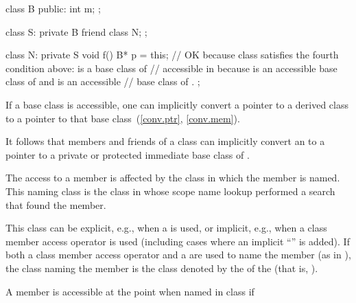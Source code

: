 \begin{example}
\begin{codeblock}
class B {
public:
  int m;
};

class S: private B {
  friend class N;
};

class N: private S {
  void f() {
    B* p = this;    // OK because class  satisfies the fourth condition above:  is a base class of 
                    // accessible in  because  is an accessible base class of  and  is an accessible
                    // base class of .
  }
};
\end{codeblock}
\end{example}

\pnum
If a base class is accessible, one can implicitly convert a pointer to
a derived class to a pointer to that base class~(\ref{conv.ptr}, \ref{conv.mem}).
\begin{note}
It follows that
members and friends of a class
can implicitly convert an
to a pointer to a private or protected immediate base class of
.
\end{note}
The access to a member is affected by the class in which the member is
named.
This naming class is
the class in whose scope name lookup performed a search that found the member.
\begin{note}
This class can be explicit, e.g., when a
is used, or implicit, e.g., when a class member access operator is used (including cases where an implicit
``''
is
added).
If both a class member access operator and a
are used to name the member (as in
),
the class naming the member is the class denoted by the
of the
(that is,
).
\end{note}
A member
is accessible at the point
when named in class
if
